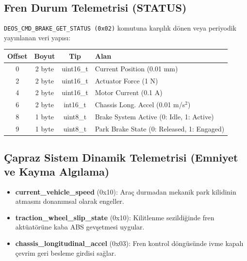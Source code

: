 \documentclass[a4paper,10pt]{article}
\newcommand{\code}[1]{\texttt{#1}}
\begin{document}
\subsection{Fren Durum Telemetrisi (STATUS)}

\code{DEOS\_CMD\_BRAKE\_GET\_STATUS (0x02)} komutuna karşılık dönen veya periyodik yayınlanan veri yapısı:

\begin{center}
\begin{tabular}{c c c l}
\toprule
\textbf{Offset} & \textbf{Boyut} & \textbf{Tip} & \textbf{Alan} \\
\midrule
0 & 2 byte & uint16\_t & Current Position (0.01 mm) \\
2 & 2 byte & uint16\_t & Actuator Force (1 N) \\
4 & 2 byte & uint16\_t & Motor Current (0.1 A) \\
6 & 2 byte & int16\_t  & Chassis Long. Accel (0.01 m/s$^2$) \\
8 & 1 byte & uint8\_t  & Brake System Active (0: Idle, 1: Active) \\
9 & 1 byte & uint8\_t  & Park Brake State (0: Released, 1: Engaged) \\
\bottomrule
\end{tabular}
\end{center}

\subsection{Çapraz Sistem Dinamik Telemetrisi (Emniyet ve Kayma Algılama)}
\begin{itemize}
    \item \textbf{current\_vehicle\_speed} (0x10): Araç durmadan mekanik park kilidinin atmasını donanımsal olarak engeller.
    \item \textbf{traction\_wheel\_slip\_state} (0x10): Kilitlenme sezildiğinde fren aktüatörüne kaba ABS gevşetmesi uygular.
    \item \textbf{chassis\_longitudinal\_accel} (0x03): Fren kontrol döngüsünde ivme kapalı çevrim geri besleme girdisi sağlar.
\end{itemize}
\end{document}
